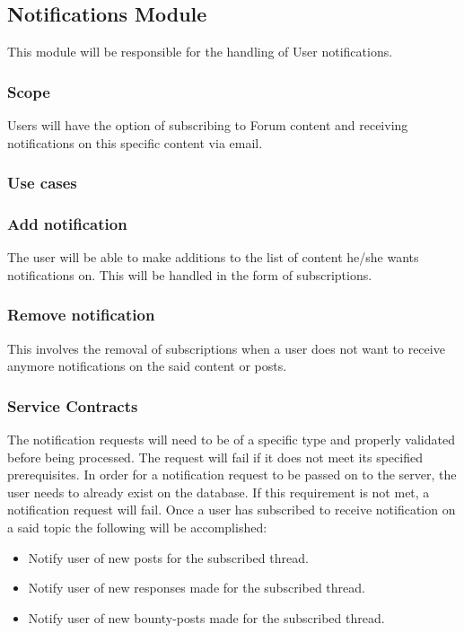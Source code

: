 \subsection{Notifications Module}
\par{This module will be responsible for the handling of User notifications.}
\subsubsection{Scope}
\par{Users will have the option of subscribing to Forum content and receiving notifications on this specific content via email.}


\subsubsection{Use cases}
\subsubsection*{Add notification}
\par {The user will be able to make additions to the list of content he/she wants notifications on. This will be handled in the form of subscriptions.}
\subsubsection*{Remove notification}
\par{This involves the removal of subscriptions when a user does not want to receive anymore notifications on the said content or posts.}

\subsubsection{Service Contracts}
\par{The notification requests will need to be of a specific type and properly validated before being processed. The request will fail if it does not meet its specified prerequisites. In order for a notification request to be passed on to the server, the user needs to already exist on the database. If this requirement is not met, a notification request will fail. Once a user has subscribed to receive notification on a said topic the following will be accomplished:}
\medskip
\begin{itemize}
\item Notify user of new posts for the subscribed thread.
\item Notify user of new responses made for the subscribed thread.
\item Notify user of new bounty-posts made for the subscribed thread.
\end{itemize}

